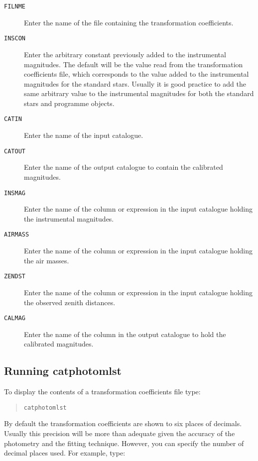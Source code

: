 \documentclass[twoside,11pt]{article}
\renewcommand{\_}{\texttt{\symbol{95}}}
\begin{document}
\begin{description}

  \item[ {\tt FILNME} ] Enter the name of the file containing the
   transformation coefficients.

  \item[ {\tt INSCON} ] Enter the arbitrary constant previously added
   to the instrumental magnitudes.  The default will be the value
   read from the transformation coefficients file, which corresponds
   to the value added to the instrumental magnitudes for the standard
   stars.  Usually it is good practice to add the same arbitrary
   value to the instrumental magnitudes for both the standard stars
   and programme objects.

  \item[ {\tt CATIN} ] Enter the name of the input catalogue.

  \item[ {\tt CATOUT} ] Enter the name of the output catalogue to
   contain the calibrated magnitudes.

  \item[ {\tt INSMAG} ] Enter the name of the column or expression
   in the input catalogue holding the instrumental magnitudes.

  \item[ {\tt AIRMASS} ] Enter the name of the column or expression
   in the input catalogue holding the air masses.

  \item[ {\tt ZENDST} ] Enter the name of the column or expression
   in the input catalogue holding the observed zenith distances.

  \item[ {\tt CALMAG} ] Enter the name of the column in the output
   catalogue to hold the calibrated magnitudes.

\end{description}

\subsection{Running catphotomlst}

To display the contents of a transformation coefficients file type:

\begin{verse}
{\tt catphotomlst}
\end{verse}

By default the transformation coefficients are shown to six places of
decimals.  Usually this precision will be more than adequate given
the accuracy of the photometry and the fitting technique.  However,
you can specify the number of decimal places used.  For example, type:
\end{document}
